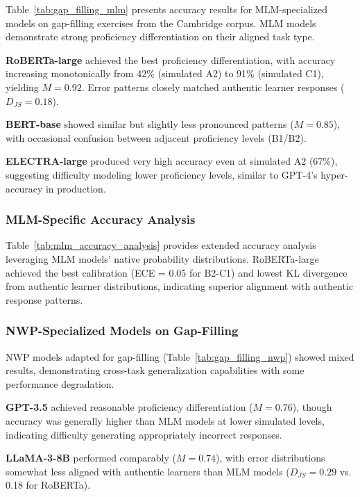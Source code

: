 Table~\ref{tab:gap_filling_mlm} presents accuracy results for MLM-specialized models on gap-filling exercises from the Cambridge corpus. MLM models demonstrate strong proficiency differentiation on their aligned task type.



\textbf{RoBERTa-large} achieved the best proficiency differentiation, with accuracy increasing monotonically from 42\% (simulated A2) to 91\% (simulated C1), yielding $M = 0.92$. Error patterns closely matched authentic learner responses ($D_{JS} = 0.18$).

\textbf{BERT-base} showed similar but slightly less pronounced patterns ($M = 0.85$), with occasional confusion between adjacent proficiency levels (B1/B2).

\textbf{ELECTRA-large} produced very high accuracy even at simulated A2 (67\%), suggesting difficulty modeling lower proficiency levels, similar to GPT-4's hyper-accuracy in production.

\subsubsection{MLM-Specific Accuracy Analysis}

Table~\ref{tab:mlm_accuracy_analysis} provides extended accuracy analysis leveraging MLM models' native probability distributions. RoBERTa-large achieved the best calibration (ECE = 0.05 for B2-C1) and lowest KL divergence from authentic learner distributions, indicating superior alignment with authentic response patterns.



\subsubsection{NWP-Specialized Models on Gap-Filling}

NWP models adapted for gap-filling (Table~\ref{tab:gap_filling_nwp}) showed mixed results, demonstrating cross-task generalization capabilities with some performance degradation.



\textbf{GPT-3.5} achieved reasonable proficiency differentiation ($M = 0.76$), though accuracy was generally higher than MLM models at lower simulated levels, indicating difficulty generating appropriately incorrect responses.

\textbf{LLaMA-3-8B} performed comparably ($M = 0.74$), with error distributions somewhat less aligned with authentic learners than MLM models ($D_{JS} = 0.29$ vs. 0.18 for RoBERTa).

